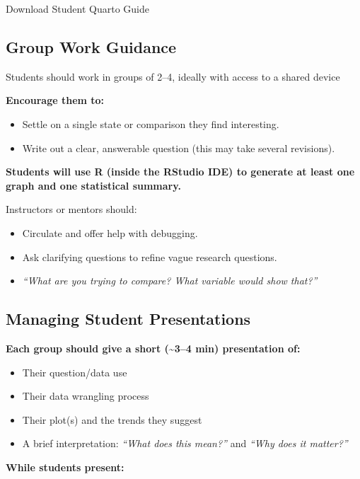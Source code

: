\documentclass[
]{article}
\providecommand{\tightlist}{%
  \setlength{\itemsep}{0pt}\setlength{\parskip}{0pt}}\usepackage{longtable,booktabs,array}
\begin{document}
Download Student Quarto Guide

\subsection{Group Work Guidance}\label{group-work-guidance}

Students should work in groups of 2--4, ideally with access to a shared
device

\textbf{Encourage them to:}

\begin{itemize}
\item
  Settle on a single state or comparison they find interesting.
\item
  Write out a clear, answerable question (this may take several
  revisions).
\end{itemize}

\textbf{Students will use R (inside the RStudio IDE) to generate at
least one graph and one statistical summary.}

Instructors or mentors should:

\begin{itemize}
\item
  Circulate and offer help with debugging.
\item
  Ask clarifying questions to refine vague research questions.
\item
  \emph{``What are you trying to compare? What variable would show
  that?''}
\end{itemize}

\subsection{Managing Student
Presentations}\label{managing-student-presentations}

\textbf{Each group should give a short (\textasciitilde3--4 min)
presentation of:}

\begin{itemize}
\tightlist
\item
  Their question/data use
\item
  Their data wrangling process
\item
  Their plot(s) and the trends they suggest
\item
  A brief interpretation: \emph{``What does this mean?''} and
  \emph{``Why does it matter?''}
\end{itemize}

\textbf{While students present:}
\end{document}
